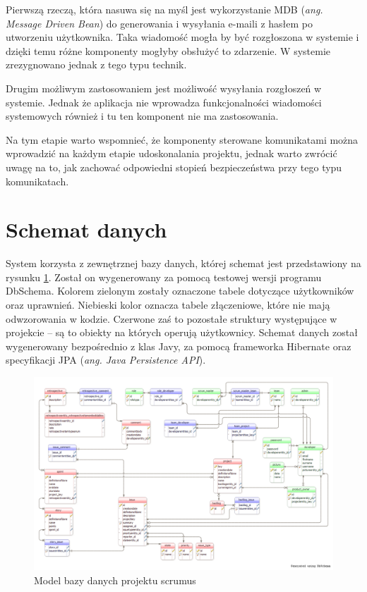Pierwszą rzeczą, która nasuwa się na myśl jest wykorzystanie MDB (\textit{ang. Message Driven Bean}) do generowania i wysyłania e-maili z hasłem po utworzeniu użytkownika. Taka wiadomość mogła by być rozgłoszona w systemie i dzięki temu różne komponenty mogłyby obsłużyć to zdarzenie. W systemie zrezygnowano jednak z tego typu technik.

Drugim możliwym zastosowaniem jest możliwość wysyłania rozgłoszeń w systemie. Jednak że aplikacja nie wprowadza funkcjonalności wiadomości systemowych również i tu ten komponent nie ma zastosowania.

Na tym etapie warto wspomnieć, że komponenty sterowane komunikatami można wprowadzić na każdym etapie udoskonalania projektu, jednak warto zwrócić uwagę na to, jak zachować odpowiedni stopień bezpieczeństwa przy tego typu komunikatach.

\section{Schemat danych}
System korzysta z zewnętrznej bazy danych, której schemat jest przedstawiony na rysunku \ref{fig:modeldb}. Został on wygenerowany za pomocą testowej wersji programu DbSchema. Kolorem zielonym zostały oznaczone tabele dotyczące użytkowników oraz uprawnień. Niebieski kolor oznacza tabele złączeniowe, które nie mają odwzorowania w kodzie. Czerwone zaś to pozostałe struktury występujące w projekcie -- są to obiekty na których operują użytkownicy. Schemat danych został wygenerowany bezpośrednio z klas Javy, za pomocą frameworka Hibernate oraz specyfikacji JPA (\textit{ang. Java Persistence API}).

\begin{figure}
	\centering
	\includegraphics[width=25cm]{rysunki/modeldb.png}	
	\caption{Model bazy danych projektu scrumus}
	\label{fig:modeldb}
\end{figure}

